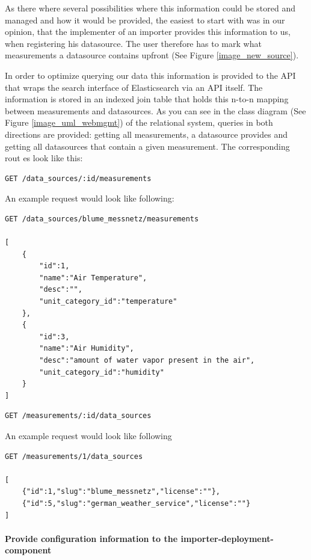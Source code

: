 As there where several possibilities where this information could be
stored and managed and how it would be provided, the easiest to start
with was in our opinion, that the implementer of an importer provides
this information to us, when registering his datasource. The user
therefore has to mark what measurements a datasource contains upfront (See Figure \ref{image_new_source}).

In order to optimize querying our data this information is provided to
the API that wraps the search interface of Elasticsearch via an API
itself. The information is stored in an indexed join table that holds
this n-to-n mapping between measurements and datasources. As you can see
in the class diagram (See Figure \ref{image_uml_webmgmt}) of the relational system,
queries in both directions are provided: getting all measurements, a
datasource provides and getting all datasources that contain a given
measurement. The corresponding rout es look like this:

\begin{verbatim}
GET /data_sources/:id/measurements
\end{verbatim}

An example request would look like following:

\begin{verbatim}
GET /data_sources/blume_messnetz/measurements

[
	{
		"id":1,
		"name":"Air Temperature",
		"desc":"",
		"unit_category_id":"temperature"
	},
	{
		"id":3,
		"name":"Air Humidity",
		"desc":"amount of water vapor present in the air",
		"unit_category_id":"humidity"
	}
]
\end{verbatim}

\begin{verbatim}
GET /measurements/:id/data_sources
\end{verbatim}

An example request would look like following

\begin{verbatim}
GET /measurements/1/data_sources

[
	{"id":1,"slug":"blume_messnetz","license":""},
	{"id":5,"slug":"german_weather_service","license":""}
]
\end{verbatim}

\paragraph{Provide configuration information to the
	importer-deployment-component}\label{provide-configuration-information-to-the-importer-deployment-component}

